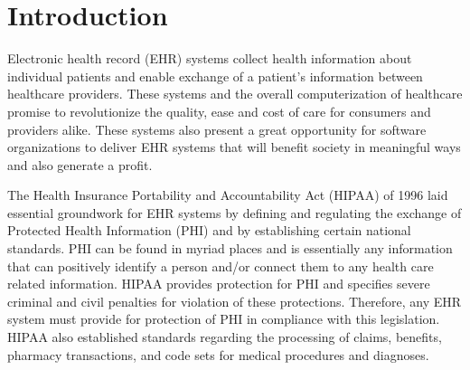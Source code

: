 \documentclass[10pt]{article}
\begin{document}





\section{Introduction}
\label{sec:Introduction}

Electronic health record (EHR) systems collect health information about individual patients 
and enable exchange of a patient's information between healthcare providers.
These systems and the overall computerization of healthcare promise to revolutionize the quality, ease and cost of care for consumers and providers alike.
These systems also present a great opportunity for software organizations to deliver EHR systems that will benefit society in meaningful ways and also generate a profit.


The Health Insurance Portability and Accountability Act (HIPAA) of 1996 laid essential groundwork for EHR systems by defining and regulating the exchange of Protected Health Information (PHI) and by establishing certain national standards.
PHI can be found in myriad places and is essentially any information that can positively identify a person and/or connect them to any health care related information.
HIPAA provides protection for PHI and specifies severe criminal and civil penalties for violation of these protections.
Therefore, any EHR system must provide for protection of PHI in compliance with this legislation.
HIPAA also established standards regarding the processing of claims, benefits, pharmacy transactions, and code sets for medical procedures and diagnoses. 
\cite{ehrbook}
\end{document}
